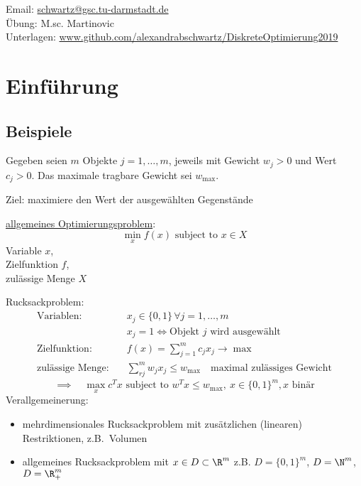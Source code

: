 
Email: \url{schwartz@gsc.tu-darmstadt.de}\\
Übung: M.sc. Martinovic\\
Unterlagen: \url{www.github.com/alexandrabschwartz/DiskreteOptimierung2019}

\section{Einführung}
\subsection{Beispiele}
\begin{beispiel}[Rucksackproblem]\enter
	Gegeben seien $m$ Objekte $j=1,\dots,m$, jeweils mit Gewicht $w_{j}>0$ und Wert $c_{j}>0$. Das maximale tragbare Gewicht sei $w_{\max}$.

	Ziel: maximiere den Wert der ausgewählten Gegenstände
\end{beispiel}

\underline{allgemeines Optimierungsproblem}:
\begin{equation*}
	\min_{x} f(x) \text{ subject to } x \in X
\end{equation*}
Variable $x$,\\
Zielfunktion $f$, \\
zulässige Menge $X$

Rucksackproblem:
\begin{align*}
\text{Variablen}:\quad & x_{j} \in \{0,1\}\, \forall j =1, \dots, m\\
				 & x_{j}=1 \iff \text{Objekt $j$ wird ausgewählt}\\
\text{Zielfunktion}:\quad& f(x)= \sum_{j=1}^{m} c_j x_{j}\rightarrow \max\\
\text{zulässige Menge}:\quad & \sum_{rj}^{m} w_j x_j \leq w_{\max}\quad \text{maximal zulässiges Gewicht}
\end{align*}
\begin{equation*}
	\implies \quad \max_{x}c^Tx \text{ subject to } w^Tx \leq w_{\max},\ x \in \{0,1\}^m, x \text{ binär}
\end{equation*}
Verallgemeinerung:
\begin{itemize}
	\item mehrdimensionales Rucksackproblem mit zusätzlichen (linearen) Restriktionen, z.B.\ Volumen
  \item allgemeines Rucksackproblem mit $x\in D\subset \R^m$ z.B. $D=\{0,1\}^m$, $D=\N^m$, $D = \R_{+}^m$
\end{itemize}

